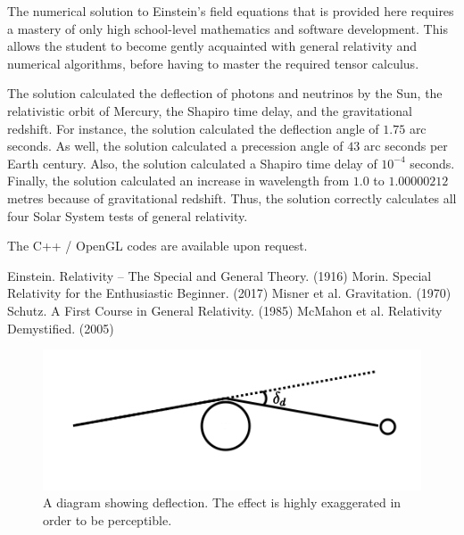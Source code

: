 \documentclass[12pt]{article}
\begin{document}
The numerical solution to Einstein's field equations that is provided here requires a mastery of only high school-level mathematics and software development.
This allows the student to become gently acquainted with general relativity and numerical algorithms, before having to master the required tensor calculus.

The solution calculated the deflection of photons and neutrinos by the Sun, the relativistic orbit of Mercury, the Shapiro time delay, and the gravitational redshift.
For instance, the solution calculated the deflection angle of $1.75$ arc seconds.
As well, the solution calculated a precession angle of $43$ arc seconds per Earth century.
Also, the solution calculated a Shapiro time delay of $10^{-4}$ seconds.
Finally, the solution calculated an increase in wavelength from $1.0$ to $1.00000212$ metres because of gravitational redshift.
Thus, the solution correctly calculates all four Solar System tests of general relativity.

The C++ / OpenGL codes are available upon request.



\pagebreak


\begin{thebibliography}{9}


 Einstein. Relativity -- The Special and General Theory. (1916)
 Morin. Special Relativity for the Enthusiastic Beginner. (2017)
 Misner et al. Gravitation. (1970)
 Schutz. A First Course in General Relativity. (1985)
 McMahon et al. Relativity Demystified. (2005)

\end{thebibliography}


\pagebreak



\begin{figure} 
\centering
\label{fig1}
  \includegraphics[width = 6 in]{deflection.png}
  \caption{ A diagram showing deflection.
The effect is highly exaggerated in order to be perceptible.
}
\end{figure}
\end{document}
